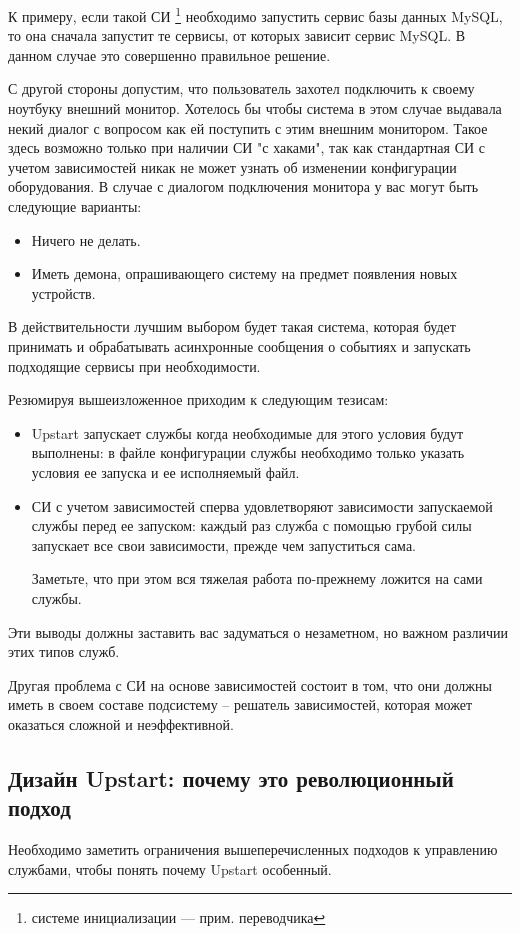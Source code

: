 К примеру, если такой СИ \footnote{системе инициализации --- прим. переводчика} необходимо запустить сервис базы данных MySQL, то она сначала запустит те сервисы, от которых зависит сервис MySQL. В данном случае это совершенно правильное решение.

С другой стороны допустим, что пользователь захотел подключить к своему ноутбуку внешний монитор. Хотелось бы чтобы система в этом случае выдавала некий диалог с вопросом как ей поступить с этим внешним монитором. Такое здесь возможно только при наличии СИ "с хаками", так как стандартная СИ с учетом зависимостей никак не может узнать об изменении конфигурации оборудования. В случае с диалогом подключения монитора у вас могут быть следующие варианты: \begin{itemize}
\item Ничего не делать.
\item Иметь демона, опрашивающего систему на предмет появления новых устройств.
\end{itemize} 
В действительности лучшим выбором будет такая система, которая будет принимать и обрабатывать асинхронные сообщения о событиях и запускать подходящие сервисы при необходимости.

Резюмируя вышеизложенное приходим к следующим тезисам: \begin{itemize}
\item Upstart запускает службы когда необходимые для этого условия будут выполнены: в файле конфигурации службы необходимо только указать условия ее запуска и ее исполняемый файл.
\item СИ с учетом зависимостей сперва удовлетворяют зависимости запускаемой службы перед ее запуском: каждый раз служба с помощью грубой силы запускает все свои зависимости, прежде чем запуститься сама.

Заметьте, что при этом вся тяжелая работа по-прежнему ложится на сами службы.
\end{itemize}
Эти выводы должны заставить вас задуматься о незаметном, но важном различии этих типов служб.

Другая проблема с СИ на основе зависимостей состоит в том, что они должны иметь в своем составе подсистему -- решатель зависимостей, которая может оказаться сложной и неэффективной.
\subsection{Дизайн Upstart: почему это революционный подход}
Необходимо заметить ограничения вышеперечисленных подходов к управлению службами, чтобы понять почему Upstart особенный.

